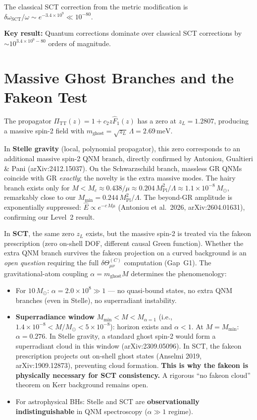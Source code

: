 \documentclass[11pt,a4paper]{article}
\newcommand{\PiTT}{\Pi_{\mathrm{TT}}}
\newcommand{\Fhat}{\hat{F}}
\newcommand{\MPl}{M_{\mathrm{Pl}}}
\newcommand{\Msun}{M_\odot}
\newcommand{\Mmin}{M_{\mathrm{min}}}
\begin{document}
The classical SCT correction from the metric modification is
$\delta\omega_{\mathrm{SCT}}/\omega \sim e^{-3.4 \times 10^9} \ll 10^{-80}$.

\textbf{Key result:} Quantum corrections dominate over classical SCT
corrections by $\sim 10^{3.4 \times 10^9 - 80}$ orders of magnitude.

\section{Massive Ghost Branches and the Fakeon Test}\label{sec:fakeon}

The propagator $\PiTT(z) = 1 + c_2 z \Fhat_1(z)$ has a zero at
$z_L = 1.2807$, producing a massive spin-2 field with
$m_{\mathrm{ghost}} = \sqrt{z_L}\,\Lambda = 2.69\,\mathrm{meV}$.

In \textbf{Stelle gravity} (local, polynomial propagator), this zero
corresponds to an additional massive spin-2 QNM branch, directly confirmed
by Antoniou, Gualtieri \& Pani (arXiv:2412.15037).
On the Schwarzschild branch, massless GR QNMs coincide with GR
\emph{exactly}; the novelty is the extra massive modes.
The hairy branch exists only for $M < M_c \approx 0.438/\mu
\approx 0.204\,\MPl^2/\Lambda \approx 1.1 \times 10^{-8}\,\Msun$,
remarkably close to our $\Mmin = 0.244\,\MPl^2/\Lambda$.
The beyond-GR amplitude is exponentially suppressed: $\hat{E} \propto e^{-c\,M\mu}$
(Antoniou et al.\ 2026, arXiv:2604.01631), confirming our Level~2 result.

In \textbf{SCT}, the same zero $z_L$ exists, but the massive spin-2
is treated via the fakeon prescription (zero on-shell DOF, different
causal Green function). Whether the extra QNM branch survives the
fakeon projection on a curved background is an \emph{open question}
requiring the full $\delta\Theta^{(C)}_{\mu\nu}$ computation (Gap~G1).
The gravitational-atom coupling $\alpha = m_{\mathrm{ghost}} M$
determines the phenomenology:

\begin{itemize}
\item For $10\,\Msun$: $\alpha = 2.0 \times 10^8 \gg 1$ ---
no quasi-bound states, no extra QNM branches (even in Stelle),
no superradiant instability.

\item \textbf{Superradiance window} $\Mmin < M < M_{\alpha=1}$
(i.e., $1.4 \times 10^{-8} < M/\Msun < 5 \times 10^{-8}$):
horizon exists and $\alpha < 1$. At $M = \Mmin$: $\alpha = 0.276$.
In Stelle gravity, a standard ghost spin-2 would form a superradiant
cloud in this window (arXiv:2309.05096).
In SCT, the fakeon prescription projects out on-shell ghost states
(Anselmi 2019, arXiv:1909.12873), preventing cloud formation.
\textbf{This is why the fakeon is physically necessary for SCT consistency.}
A rigorous ``no fakeon cloud'' theorem on Kerr background remains open.

\item For astrophysical BHs: Stelle and SCT are \textbf{observationally
indistinguishable} in QNM spectroscopy ($\alpha \gg 1$ regime).
\end{itemize}
\end{document}
